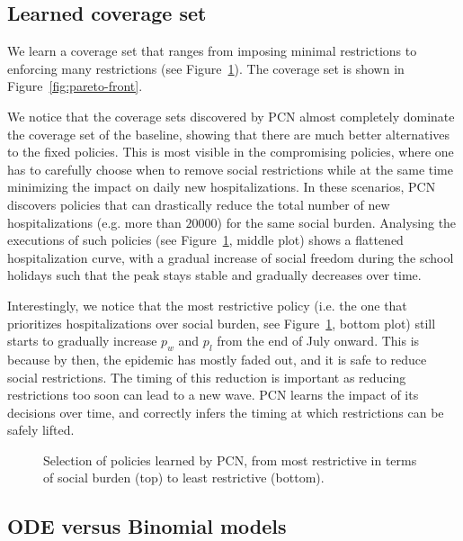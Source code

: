 \documentclass{article}
\begin{document}
\subsection{Learned coverage set}

We learn a coverage set that ranges from imposing minimal restrictions to enforcing many restrictions (see Figure~\ref{fig:policy-execution}). The coverage set is shown in Figure~\ref{fig:pareto-front}.

We notice that the coverage sets discovered by PCN almost completely dominate the coverage set of the baseline, showing that there are much better alternatives to the fixed policies. This is most visible in the compromising policies, where one has to carefully choose when to remove social restrictions while at the same time minimizing the impact on daily new hospitalizations. In these scenarios, PCN discovers policies that can drastically reduce the total number of new hospitalizations (e.g. more than $20000$) for the same social burden. Analysing the executions of such policies (see Figure~\ref{fig:policy-execution}, middle plot) shows a flattened hospitalization curve, with a gradual increase of social freedom during the school holidays such that the peak stays stable and gradually decreases over time.

Interestingly, we notice that the most restrictive policy (i.e. the one that prioritizes hospitalizations over social burden, see Figure~\ref{fig:policy-execution}, bottom plot) still starts to gradually increase $p_w$ and $p_l$ from the end of July onward. This is because by then, the epidemic has mostly faded out, and it is safe to reduce social restrictions. The timing of this reduction is important as reducing restrictions too soon can lead to a new wave. PCN learns the impact of its decisions over time, and correctly infers the timing at which restrictions can be safely lifted.

\begin{figure}
  \centering
  
  \caption{Selection of policies learned by PCN, from most restrictive in terms of social burden (top) to least restrictive (bottom).
  }
  \label{fig:policy-execution}
\end{figure}

\subsection{ODE versus Binomial models}
\label{sec:ode-vs-binomial}
\end{document}
